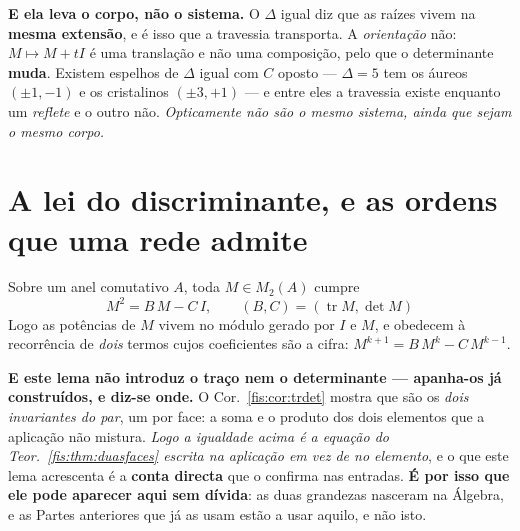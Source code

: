 \documentclass[livro.tex]{subfiles}
\begin{document}
\medskip\noindent\textbf{E ela leva o corpo, não o sistema.} O $\Delta$ igual diz
que as raízes vivem na \textbf{mesma extensão}, e é isso que a travessia
transporta. A \emph{orientação} não: $M\mapsto M+tI$ é uma translação e não uma
composição, pelo que o determinante \textbf{muda}. Existem espelhos de $\Delta$
igual com $C$ oposto --- $\Delta=5$ tem os áureos $(\pm1,-1)$ e os cristalinos
$(\pm3,+1)$ --- e entre eles a travessia existe enquanto um \emph{reflete} e o
outro não. \emph{Opticamente não são o mesmo sistema, ainda que sejam o mesmo
corpo.}


\section{A lei do discriminante, e as ordens que uma rede admite}\label{fis:leidisc}

\begin{lema}\label{fis:lem:ch2}
Sobre um anel comutativo $A$, toda $M\in M_{2}(A)$ cumpre
\[
\boxed{\;M^{2}=B\,M-C\,I,\qquad (B,C)=(\operatorname{tr}M,\det M)\;}
\]
Logo as potências de $M$ vivem no módulo gerado por $I$ e $M$, e obedecem à
recorrência de \emph{dois} termos cujos coeficientes são a cifra:
$M^{k+1}=B\,M^{k}-C\,M^{k-1}$.
\end{lema}

\medskip\noindent\textbf{E este lema não introduz o traço nem o determinante ---
apanha-os já construídos, e diz-se onde.} O Cor.~\ref{fis:cor:trdet} mostra que são
os \emph{dois invariantes do par}, um por face: a soma e o produto dos dois
elementos que a aplicação não mistura. \emph{Logo a igualdade acima é a equação do
Teor.~\ref{fis:thm:duasfaces} escrita na aplicação em vez de no elemento}, e o que
este lema acrescenta é a \textbf{conta directa} que o confirma nas entradas.
\textbf{É por isso que ele pode aparecer aqui sem dívida}: as duas grandezas
nasceram na Álgebra, e as Partes anteriores que já as usam estão a usar aquilo, e
não isto.
\end{document}
